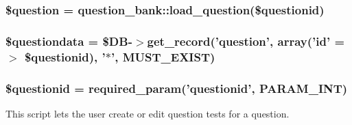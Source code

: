 \label{questiontestedit_8php_a428cf78a4e358b21d9f845e0ce3d592c}
\hypertarget{questiontestedit_8php_acf0d1ba8b3999333306bf1a4fd363e93}{
\subsubsection[{\$question}]{\setlength{\rightskip}{0pt plus 5cm}\$question = question\_\-bank::load\_\-question(\$questionid)}}
\label{questiontestedit_8php_acf0d1ba8b3999333306bf1a4fd363e93}
\hypertarget{questiontestedit_8php_ab3dbd2b3f38fc871b3aba59ed0657c55}{
\subsubsection[{\$questiondata}]{\setlength{\rightskip}{0pt plus 5cm}\$questiondata = \$DB-\/$>$get\_\-record('question', array('id' =$>$ \$questionid), '$\ast$', MUST\_\-EXIST)}}
\label{questiontestedit_8php_ab3dbd2b3f38fc871b3aba59ed0657c55}
\hypertarget{questiontestedit_8php_a0b8a9e6194c5b1ca51e0f19a198c19d8}{
\subsubsection[{\$questionid}]{\setlength{\rightskip}{0pt plus 5cm}\$questionid = required\_\-param('questionid', PARAM\_\-INT)}}
\label{questiontestedit_8php_a0b8a9e6194c5b1ca51e0f19a198c19d8}
This script lets the user create or edit question tests for a question.

